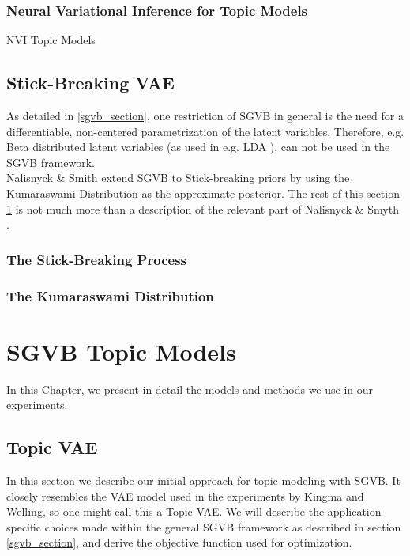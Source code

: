 \documentclass{report}
\begin{document}
\subsection{Neural Variational Inference for Topic Models}\label{NVItopic}
NVI Topic Models
\section{Stick-Breaking VAE}\label{sbvae_section}
	As detailed in \ref{sgvb_section}, one restriction of SGVB in general is the need for a differentiable, non-centered parametrization of the latent variables. Therefore, e.g. Beta distributed latent variables (as used in e.g. LDA \cite{bleil2003latent}), can not be used in the SGVB framework. \\ Nalisnyck \& Smith extend SGVB to Stick-breaking priors by using the Kumaraswami Distribution as the approximate posterior. The rest of this section \ref{sbvae_section} is not much more than a description of the relevant part of Nalisnyck \& Smyth \cite{nalisnick2016deep}.
	
	
	\subsection{The Stick-Breaking Process}\label{sb_process}
	
	\subsection{The Kumaraswami Distribution}\label{kum}
	

\chapter{SGVB Topic Models}
In this Chapter, we present in detail the models and methods we use in our experiments. 

\section{Topic VAE}\label{TopicVAE}

In this section we describe our initial approach for topic modeling with SGVB. It closely resembles the VAE model used in the experiments by Kingma and Welling\cite{kingma2013auto}, so one might call this a Topic VAE. We will describe the application-specific choices made within the general SGVB framework as described in section \ref{sgvb_section}, and derive the objective function used for optimization. 
\end{document}
